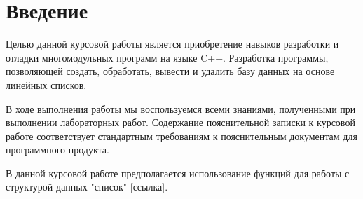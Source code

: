 \section{Введение}

Целью данной курсовой работы является приобретение навыков разработки и отладки многомодульных
программ на языке C++. Разработка программы, позволяющей создать,
обработать, вывести и удалить базу данных на основе линейных списков.

В ходе выполнения работы мы воспользуемся всеми знаниями, полученными при выполнении лабораторных работ.
Содержание пояснительной записки к курсовой работе соответствует стандартным требованиям к пояснительным документам для программного продукта.

В данной курсовой работе предполагается использование функций для
работы с структурой данных "список" [ссылка]. 
